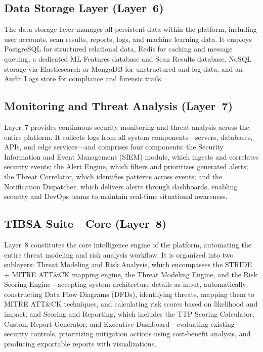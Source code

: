 \documentclass[12pt, a4paper]{article}
\begin{document}
\subsection{Data Storage Layer (Layer~6)}

The data storage layer manages all persistent data within the platform, including user accounts, scan results, reports, logs, and machine learning data. It employs PostgreSQL for structured relational data, Redis for caching and message queuing, a dedicated ML Features database and Scan Results database, NoSQL storage via Elasticsearch or MongoDB for unstructured and log data, and an Audit Logs store for compliance and forensic trails.

\subsection{Monitoring and Threat Analysis (Layer~7)}

Layer~7 provides continuous security monitoring and threat analysis across the entire platform. It collects logs from all system components---servers, databases, APIs, and edge services---and comprises four components: the Security Information and Event Management (SIEM) module, which ingests and correlates security events; the Alert Engine, which filters and prioritizes generated alerts; the Threat Correlator, which identifies patterns across events; and the Notification Dispatcher, which delivers alerts through dashboards, enabling security and DevOps teams to maintain real-time situational awareness.

\subsection{TIBSA Suite---Core (Layer~8)}

Layer~8 constitutes the core intelligence engine of the platform, automating the entire threat modeling and risk analysis workflow. It is organized into two sublayers: Threat Modeling and Risk Analysis, which encompasses the STRIDE + MITRE ATT\&CK mapping engine, the Threat Modeling Engine, and the Risk Scoring Engine---accepting system architecture details as input, automatically constructing Data Flow Diagrams (DFDs), identifying threats, mapping them to MITRE ATT\&CK techniques, and calculating risk scores based on likelihood and impact; and Scoring and Reporting, which includes the TTP Scoring Calculator, Custom Report Generator, and Executive Dashboard---evaluating existing security controls, prioritizing mitigation actions using cost-benefit analysis, and producing exportable reports with visualizations.
\end{document}

